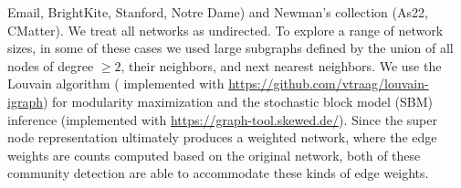 Email, BrightKite, Stanford, Notre Dame) and Newman's collection\cite{newmandata}
(As22, CMatter). We treat all networks as undirected. To explore a range of network sizes, in some of these cases we used large subgraphs defined by the union of all nodes of degree $\geq 2$, their neighbors, and next nearest neighbors. We use the Louvain algorithm ( implemented with \url{https://github.com/vtraag/louvain-igraph})
for modularity maximization \cite{blondel} and the stochastic block model (SBM) inference (implemented with \url{https://graph-tool.skewed.de/}).
Since the super node representation ultimately produces a weighted network, where the edge weights are counts computed based on the original network, both of these community detection are able to accommodate these kinds of edge weights. 

